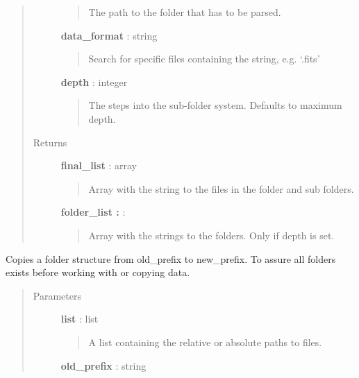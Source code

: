 \documentclass[a4paper,10pt,english]{sphinxmanual}
\begin{document}
\begin{fulllineitems}
\begin{fulllineitems}
\begin{quote}
\begin{description}
\begin{quote}
The path to the folder that has to be parsed.
\end{quote}

\textbf{data\_format} : string
\begin{quote}

Search for specific files containing the string, e.g.
`.fits'
\end{quote}

\textbf{depth} : integer
\begin{quote}

The steps into the sub-folder system. Defaults to maximum depth.
\end{quote}

\item[{Returns }] \leavevmode
\textbf{final\_list} : array
\begin{quote}

Array with the string to the files in the folder and sub folders.
\end{quote}

\textbf{folder\_list :} :
\begin{quote}

Array with the strings to the folders. Only if depth is set.
\end{quote}

\end{description}\end{quote}

\end{fulllineitems}


\begin{fulllineitems}
\label{maps:astrolyze.maps.stack.Stack.copy_structure}
Copies a folder structure from old\_prefix to new\_prefix. To assure all
folders exists before working with or copying data.
\begin{quote}\begin{description}
\item[{Parameters }] \leavevmode
\textbf{list} : list
\begin{quote}

A list containing the relative or absolute paths to files.
\end{quote}

\textbf{old\_prefix} : string
\begin{quote}


\end{quote}
\end{description}
\end{quote}
\end{fulllineitems}
\end{fulllineitems}
\end{document}
